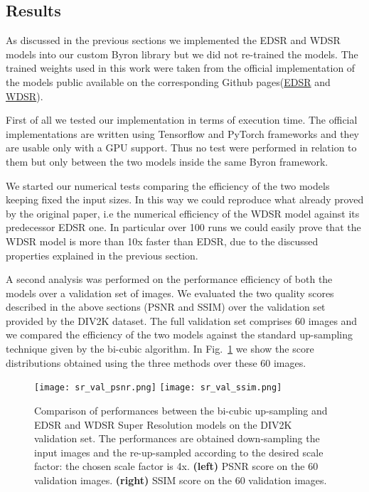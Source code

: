 \documentclass{standalone}
\begin{document}
\subsection[Results]{Results}\label{SR:results}

As discussed in the previous sections we implemented the EDSR and WDSR models into our custom \textsf{Byron} library but we did not re-trained the models.
The trained weights used in this work were taken from the official implementation of the models public available on the corresponding Github pages(\href{https://github.com/thstkdgus35/EDSR-PyTorch}{EDSR} and \href{https://github.com/JiahuiYu/wdsr_ntire2018}{WDSR}).

First of all we tested our implementation in terms of execution time.
The official implementations are written using \textsf{Tensorflow} and \textsf{PyTorch} frameworks and they are usable only with a GPU support.
Thus no test were performed in relation to them but only between the two models inside the same \textsf{Byron} framework.

We started our numerical tests comparing the efficiency of the two models keeping fixed the input sizes.
In this way we could reproduce what already proved by the original paper, i.e the numerical efficiency of the WDSR model against its predecessor EDSR one.
In particular over 100 runs we could easily prove that the WDSR model is more than 10x faster than EDSR, due to the discussed properties explained in the previous section.

A second analysis was performed on the performance efficiency of both the models over a validation set of images.
We evaluated the two quality scores described in the above sections (PSNR and SSIM) over the validation set provided by the DIV2K dataset.
The full validation set comprises 60 images and we compared the efficiency of the two models against the standard up-sampling technique given by the bi-cubic algorithm.
In Fig.~\ref{fig:sr_validation} we show the score distributions obtained using the three methods over these 60 images.

\begin{center}
\begin{figure}[htbp]
\centering
\texttt{[image: sr\_val\_psnr.png]}
\quad
\texttt{[image: sr\_val\_ssim.png]}
\caption{Comparison of performances between the bi-cubic up-sampling and EDSR and WDSR Super Resolution models on the DIV2K validation set.
The performances are obtained down-sampling the input images and the re-up-sampled according to the desired scale factor: the chosen scale factor is 4x.
\textbf{(left)} PSNR score on the 60 validation images.
\textbf{(right)} SSIM score on the 60 validation images.
}
\label{fig:sr_validation}
\end{figure}
\end{center}
\end{document}

